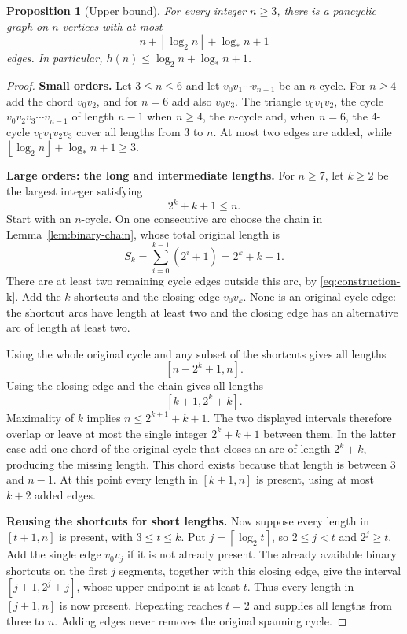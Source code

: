 \documentclass[11pt,a4paper]{article}
\numberwithin{equation}{section}
\newtheorem{proposition}[theorem]{Proposition}
\theoremstyle{definition}
\theoremstyle{remark}
\newcommand{\lstar}{\log_*}
\newcommand{\proofstep}[1]{\par\addvspace{\medskipamount}\noindent\textbf{#1}\enspace\ignorespaces}
\newcommand{\ceil}[1]{\left\lceil#1\right\rceil}
\newcommand{\floor}[1]{\left\lfloor#1\right\rfloor}
\begin{document}
\begin{proposition}[Upper bound]\label{prop:upper}
For every integer $n\ge3$, there is a pancyclic graph on $n$ vertices with at most
\[
 n+\floor{\log_2n}+\lstar n+1
\]
edges. In particular, $h(n)\le\log_2n+\lstar n+1$.
\end{proposition}
\begin{proof}
\textbf{Small orders.}\enspace
Let $3\le n\le6$ and let $v_0v_1\cdots v_{n-1}$ be an $n$-cycle. For $n\ge4$ add the chord $v_0v_2$, and for $n=6$ add also $v_0v_3$. The triangle $v_0v_1v_2$, the cycle $v_0v_2v_3\cdots v_{n-1}$ of length $n-1$ when $n\ge4$, the $n$-cycle and, when $n=6$, the $4$-cycle $v_0v_1v_2v_3$ cover all lengths from $3$ to $n$. At most two edges are added, while $\floor{\log_2n}+\lstar n+1\ge3$.

\proofstep{Large orders: the long and intermediate lengths.}
For $n\ge7$, let $k\ge2$ be the largest integer satisfying
\begin{equation}\label{eq:construction-k}
 2^k+k+1\le n.
\end{equation}
Start with an $n$-cycle. On one consecutive arc choose the chain in Lemma~\ref{lem:binary-chain}, whose total original length is
\[
 S_k=\sum_{i=0}^{k-1}(2^i+1)=2^k+k-1.
\]
There are at least two remaining cycle edges outside this arc, by \eqref{eq:construction-k}. Add the $k$ shortcuts and the closing edge $v_0v_k$. None is an original cycle edge: the shortcut arcs have length at least two and the closing edge has an alternative arc of length at least two.

Using the whole original cycle and any subset of the shortcuts gives all lengths
\[
 [n-2^k+1,n].
\]
Using the closing edge and the chain gives all lengths
\[
 [k+1,2^k+k].
\]
Maximality of $k$ implies $n\le2^{k+1}+k+1$. The two displayed intervals therefore overlap or leave at most the single integer $2^k+k+1$ between them. In the latter case add one chord of the original cycle that closes an arc of length $2^k+k$, producing the missing length. This chord exists because that length is between $3$ and $n-1$. At this point every length in $[k+1,n]$ is present, using at most $k+2$ added edges.

\proofstep{Reusing the shortcuts for short lengths.}
Now suppose every length in $[t+1,n]$ is present, with $3\le t\le k$. Put $j=\ceil{\log_2t}$, so $2\le j<t$ and $2^j\ge t$. Add the single edge $v_0v_j$ if it is not already present. The already available binary shortcuts on the first $j$ segments, together with this closing edge, give the interval $[j+1,2^j+j]$, whose upper endpoint is at least $t$. Thus every length in $[j+1,n]$ is now present. Repeating reaches $t=2$ and supplies all lengths from three to $n$. Adding edges never removes the original spanning cycle.


\end{proof}
\end{document}
